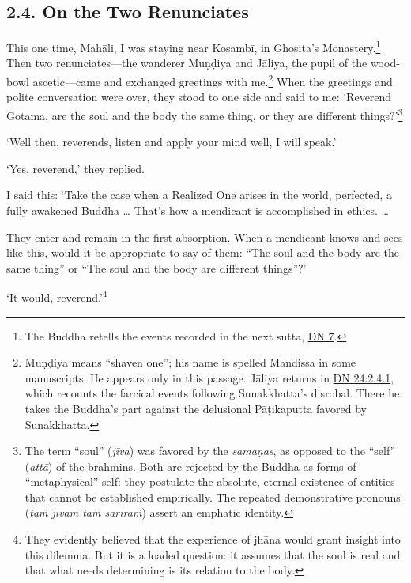 \documentclass[12pt,openany]{book}%
\begin{document}
\subsection*{2.4. On the Two Renunciates }

This one time, \textsanskrit{Mahāli}, I was staying near \textsanskrit{Kosambī}, in Ghosita’s Monastery.\footnote{The Buddha retells the events recorded in the next sutta, \href{https://suttacentral.net/dn7/en/sujato}{DN 7}. } Then two renunciates—the wanderer \textsanskrit{Muṇḍiya} and \textsanskrit{Jāliya}, the pupil of the wood-bowl ascetic—came and exchanged greetings with me.\footnote{\textsanskrit{Muṇḍiya} means “shaven one”; his name is spelled Mandissa in some manuscripts. He appears only in this passage. \textsanskrit{Jāliya} returns in \href{https://suttacentral.net/dn24/en/sujato\#2.4.1}{DN 24:2.4.1}, which recounts the farcical events following Sunakkhatta’s disrobal. There he takes the Buddha’s part against the delusional \textsanskrit{Pāṭikaputta} favored by Sunakkhatta. } When the greetings and polite conversation were over, they stood to one side and said to me: ‘Reverend Gotama, are the soul and the body the same thing, or they are different things?’\footnote{The term “soul” (\textit{\textsanskrit{jīva}}) was favored by the \textit{\textsanskrit{samaṇas}}, as opposed to the “self” (\textit{\textsanskrit{attā}}) of the brahmins. Both are rejected by the Buddha as forms of “metaphysical” self: they postulate the absolute, eternal existence of entities that cannot be established empirically. The repeated demonstrative pronouns (\textit{\textsanskrit{taṁ} \textsanskrit{jīvaṁ} \textsanskrit{taṁ} \textsanskrit{sarīraṁ}}) assert an emphatic identity. } 

‘Well then, reverends, listen and apply your mind well, I will speak.’ 

‘Yes, reverend,’ they replied. 

I said this: ‘Take the case when a Realized One arises in the world, perfected, a fully awakened Buddha … That’s how a mendicant is accomplished in ethics. … 

They enter and remain in the first absorption. When a mendicant knows and sees like this, would it be appropriate to say of them: “The soul and the body are the same thing” or “The soul and the body are different things”?’ 

‘It would, reverend.’\footnote{They evidently believed that the experience of \textsanskrit{jhāna} would grant insight into this dilemma. But it is a loaded question: it assumes that the soul is real and that what needs determining is its relation to the body. } 
\end{document}
